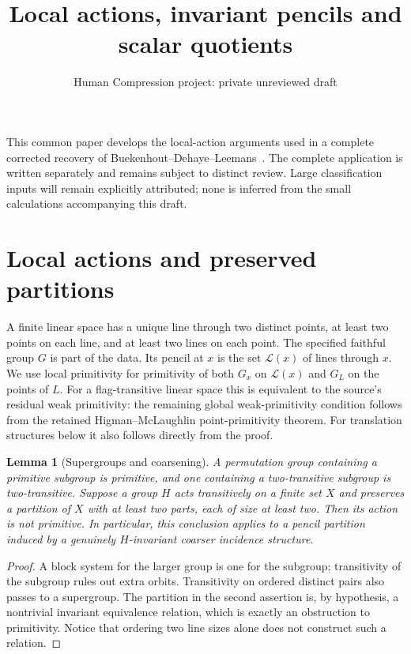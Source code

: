 \documentclass[11pt,a4paper]{article}
\title{Local actions, invariant pencils and scalar quotients}
\author{Human Compression project: private unreviewed draft}
\date{}
\newtheorem{lemma}[theorem]{Lemma}
\begin{document}
\maketitle
This common paper develops the local-action arguments used in a complete
corrected recovery of Buekenhout--Dehaye--Leemans~\cite{BDL}. The complete application is written separately and remains subject to distinct
review. Large classification
inputs will remain explicitly attributed; none is inferred from the small
calculations accompanying this draft.

\section{Local actions and preserved partitions}
A finite linear space has a unique line through two distinct points, at
least two points on each line, and at least two lines on each point. The
specified faithful group $G$ is part of the data. Its pencil at $x$ is the
set $\mathcal L(x)$ of lines through $x$. We use local primitivity for
primitivity of both $G_x$ on $\mathcal L(x)$ and $G_L$ on the points of $L$.
For a flag-transitive linear space this is equivalent to the source's
residual weak primitivity: the remaining global weak-primitivity condition
follows from the retained Higman--McLaughlin point-primitivity theorem.
For translation structures below it also follows directly from the proof.

\begin{lemma}[Supergroups and coarsening]\label{coarsening}
A permutation group containing a primitive subgroup is primitive, and one
containing a two-transitive subgroup is two-transitive. Suppose a group
$H$ acts transitively on a finite set $X$ and preserves a partition of $X$
with at least two parts, each of size at least two. Then its action is not
primitive. In particular, this conclusion applies to a pencil partition
induced by a genuinely $H$-invariant coarser incidence structure.
\end{lemma}
\begin{proof}
A block system for the larger group is one for the subgroup; transitivity
of the subgroup rules out extra orbits. Transitivity on ordered distinct
pairs also passes to a supergroup. The partition in the second assertion
is, by hypothesis, a nontrivial invariant equivalence relation, which is
exactly an obstruction to primitivity. Notice that ordering two line
sizes alone does not construct such a relation.
\end{proof}
\end{document}

